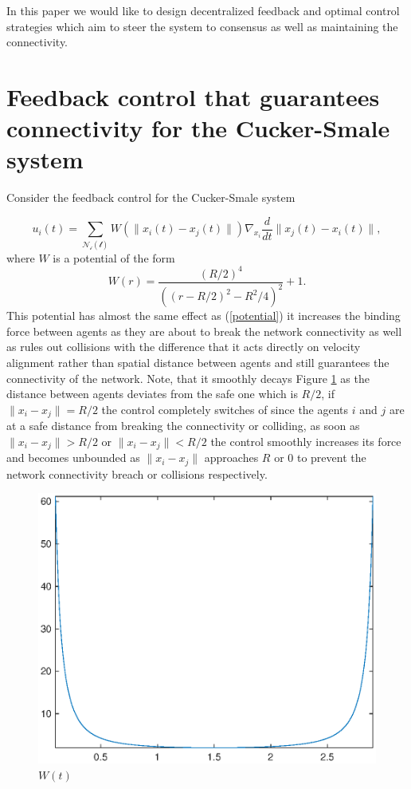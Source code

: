 \documentclass[a4paper,10pt, english]{article}
\begin{document}
In this paper we would like to design decentralized feedback and optimal control strategies which aim to steer the system to consensus as well as maintaining the connectivity.





\newpage
\section{Feedback control that guarantees connectivity for the Cucker-Smale system}
Consider the feedback control for the Cucker-Smale system 

\begin{equation}
u_i(t) = \sum_{\mathcal{N_{i}(t)}}W(\|x_i(t) - x_j(t)\|) \nabla_{x_i} \frac{d}{dt}\|x_j(t) - x_i(t)\|,
\label{myhc}
\end{equation}
where $W$ is a potential of the form
\begin{equation}
 W(r) = \frac{(R/2)^4}{((r - R/2)^2  - R^2/4)^2} + 1.
\label{potentialw}
\end{equation}
This potential has almost the same effect as (\ref{potential}) it increases the binding force between agents as they are about to break the network connectivity as well as rules out collisions with the difference that it acts directly on velocity alignment rather than spatial distance between agents and still guarantees the connectivity of the network. Note, that it smoothly decays Figure \ref{potentialwplot} as the distance between agents deviates from the safe one which is $R/2$, if $\|x_i - x_j\| = R/2$ the control completely switches of since the agents $i$ and $j$ are at a safe distance from breaking the connectivity or colliding, 
as soon as  $\|x_i - x_j\| > R/2$ or $\|x_i - x_j\| < R/2$ the control smoothly increases its force and becomes unbounded as $\|x_i - x_j\|$ approaches $R$ or $0$ to prevent the network connectivity breach or collisions respectively. 
\begin{figure}[ht]
 \centering
 \includegraphics[scale=0.5]{figures/potentialwplot.eps}
 \caption{$W(t)$}
 \label{potentialwplot}
\end{figure}
\end{document}
